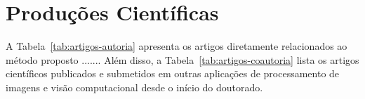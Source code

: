 \section{Produções Científicas}
\label{sec:producoes-cientificas}

A Tabela~\ref{tab:artigos-autoria} apresenta os artigos diretamente relacionados ao método proposto ....... Além disso, a Tabela~\ref{tab:artigos-coautoria} lista os artigos científicos publicados e submetidos em outras aplicações de processamento de imagens e visão computacional desde o início do doutorado.

\begin{table}[ht!]
\centering
\onehalfspacing
\caption{Produções científicas em relação ao método proposto para segmentação de rins e tumores renais.}
\label{tab:artigos-autoria}
\end{table}

\begin{table}[ht!]
\centering
\onehalfspacing
\caption{Produções científicas em outras aplicações de processamento de imagens e visão computacional.}
\label{tab:artigos-coautoria}
\end{table}